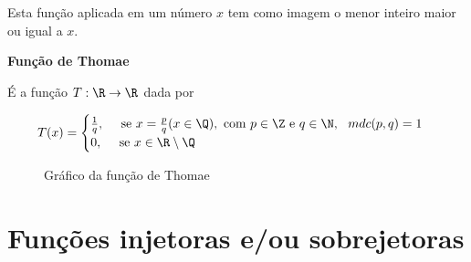  Esta função aplicada em um número $x$ tem como imagem o menor inteiro maior ou igual a $x$.
  
  \textbf{Função de Thomae}
  
  É a função $T: \R \to \R$ dada por
  
\[T(x)= \begin{cases}
         \frac{1}{q}, \ \ \ \text{ se } x= \frac{p}{q} (x \in \Q), \text{ com } p \in \Z \text{ e } q \in \N, \ \  mdc(p, q)= 1 \\
         0 , \ \ \ \text{ se } x \in \R \setminus \Q
        \end{cases}\]

  \begin{figure}[H]
  \centering
    \caption{Gráfico da função de Thomae}
  \end{figure}

\newpage
\section{Funções injetoras e/ou sobrejetoras}

